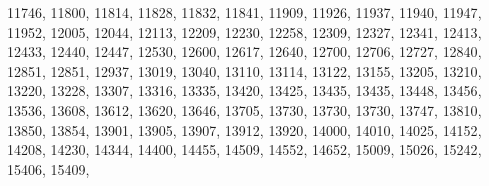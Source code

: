 \documentclass[10pt,]{krantz}
\makeatletter
\newenvironment{Shaded}{\begin{snugshade}}{\end{snugshade}}
\newcommand{\DecValTok}[1]{\textcolor[rgb]{0.00,0.00,0.81}{#1}}
\newcommand{\NormalTok}[1]{#1}
\newenvironment{kframe}{%
\medskip{}
\setlength{\fboxsep}{.8em}
 \def\at@end@of@kframe{}%
 \ifinner\ifhmode%
  \def\at@end@of@kframe{\end{minipage}}%
  \begin{minipage}{\columnwidth}%
 \fi\fi%
 \def\FrameCommand##1{\hskip\@totalleftmargin \hskip-\fboxsep
 \colorbox{shadecolor}{##1}\hskip-\fboxsep
     \hskip-\linewidth \hskip-\@totalleftmargin \hskip\columnwidth}%
 \MakeFramed {\advance\hsize-\width
   \@totalleftmargin\z@ \linewidth\hsize
   \@setminipage}}%
 {\par\unskip\endMakeFramed%
 \at@end@of@kframe}
\renewenvironment{Shaded}{\begin{kframe}}{\end{kframe}}
\makeatother
\begin{document}
\begin{Shaded}
\begin{Highlighting}[]
\DecValTok{11746}\NormalTok{, }\DecValTok{11800}\NormalTok{, }\DecValTok{11814}\NormalTok{, }\DecValTok{11828}\NormalTok{, }\DecValTok{11832}\NormalTok{, }\DecValTok{11841}\NormalTok{, }\DecValTok{11909}\NormalTok{, }\DecValTok{11926}\NormalTok{, }\DecValTok{11937}\NormalTok{, }
\DecValTok{11940}\NormalTok{, }\DecValTok{11947}\NormalTok{, }\DecValTok{11952}\NormalTok{, }\DecValTok{12005}\NormalTok{, }\DecValTok{12044}\NormalTok{, }\DecValTok{12113}\NormalTok{, }\DecValTok{12209}\NormalTok{, }\DecValTok{12230}\NormalTok{, }\DecValTok{12258}\NormalTok{, }
\DecValTok{12309}\NormalTok{, }\DecValTok{12327}\NormalTok{, }\DecValTok{12341}\NormalTok{, }\DecValTok{12413}\NormalTok{, }\DecValTok{12433}\NormalTok{, }\DecValTok{12440}\NormalTok{, }\DecValTok{12447}\NormalTok{, }\DecValTok{12530}\NormalTok{, }\DecValTok{12600}\NormalTok{, }
\DecValTok{12617}\NormalTok{, }\DecValTok{12640}\NormalTok{, }\DecValTok{12700}\NormalTok{, }\DecValTok{12706}\NormalTok{, }\DecValTok{12727}\NormalTok{, }\DecValTok{12840}\NormalTok{, }\DecValTok{12851}\NormalTok{, }\DecValTok{12851}\NormalTok{, }\DecValTok{12937}\NormalTok{,}
\DecValTok{13019}\NormalTok{, }\DecValTok{13040}\NormalTok{, }\DecValTok{13110}\NormalTok{, }\DecValTok{13114}\NormalTok{, }\DecValTok{13122}\NormalTok{, }\DecValTok{13155}\NormalTok{, }\DecValTok{13205}\NormalTok{, }\DecValTok{13210}\NormalTok{, }\DecValTok{13220}\NormalTok{, }
\DecValTok{13228}\NormalTok{, }\DecValTok{13307}\NormalTok{, }\DecValTok{13316}\NormalTok{, }\DecValTok{13335}\NormalTok{, }\DecValTok{13420}\NormalTok{, }\DecValTok{13425}\NormalTok{, }\DecValTok{13435}\NormalTok{, }\DecValTok{13435}\NormalTok{, }\DecValTok{13448}\NormalTok{, }
\DecValTok{13456}\NormalTok{, }\DecValTok{13536}\NormalTok{, }\DecValTok{13608}\NormalTok{, }\DecValTok{13612}\NormalTok{, }\DecValTok{13620}\NormalTok{, }\DecValTok{13646}\NormalTok{, }\DecValTok{13705}\NormalTok{, }\DecValTok{13730}\NormalTok{, }\DecValTok{13730}\NormalTok{, }
\DecValTok{13730}\NormalTok{, }\DecValTok{13747}\NormalTok{, }\DecValTok{13810}\NormalTok{, }\DecValTok{13850}\NormalTok{, }\DecValTok{13854}\NormalTok{, }\DecValTok{13901}\NormalTok{, }\DecValTok{13905}\NormalTok{, }\DecValTok{13907}\NormalTok{, }\DecValTok{13912}\NormalTok{,}
\DecValTok{13920}\NormalTok{, }\DecValTok{14000}\NormalTok{, }\DecValTok{14010}\NormalTok{, }\DecValTok{14025}\NormalTok{, }\DecValTok{14152}\NormalTok{, }\DecValTok{14208}\NormalTok{, }\DecValTok{14230}\NormalTok{, }\DecValTok{14344}\NormalTok{, }\DecValTok{14400}\NormalTok{, }
\DecValTok{14455}\NormalTok{, }\DecValTok{14509}\NormalTok{, }\DecValTok{14552}\NormalTok{, }\DecValTok{14652}\NormalTok{, }\DecValTok{15009}\NormalTok{, }\DecValTok{15026}\NormalTok{, }\DecValTok{15242}\NormalTok{, }\DecValTok{15406}\NormalTok{, }\DecValTok{15409}\NormalTok{, }

\end{Highlighting}
\end{Shaded}
\end{document}

